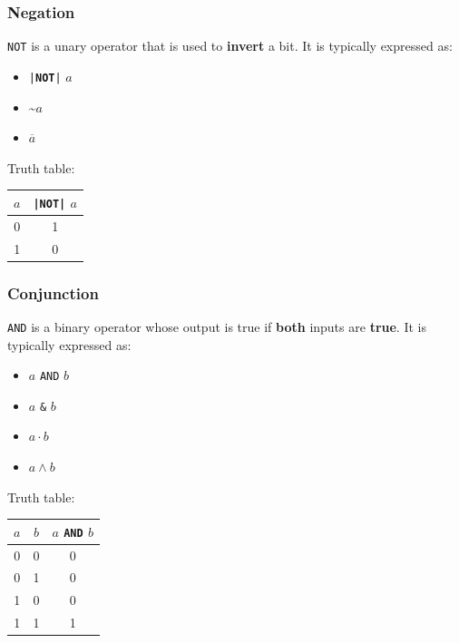 \documentclass{article}
\newcommand{\keyword}[1]{\textcolor[rgb]{0.00,0.50,0.00}{\textbf{#1}}}
\begin{document}
\subsubsection{Negation}
\texttt{NOT} is a unary operator that is used to \textbf{invert} a bit.
It is typically expressed as:
\begin{itemize}
    \item \texttt{|\keyword{NOT}|} \(a\)
    \item \textasciitilde\(a\)
    \item \(\overline{a}\)
\end{itemize}
Truth table:
\begin{table}[H]
    \centering
    \begin{tabular}{c c}
        \toprule
        \textbf{\(a\)} & \texttt{|\keyword{NOT}|} \(a\) \\
        \midrule
        0              & 1                                        \\
        1              & 0                                        \\
        \bottomrule
    \end{tabular}
\end{table}
\subsubsection{Conjunction}
\texttt{AND} is a binary operator whose output is true if \textbf{both} inputs are \textbf{true}.
It is typically expressed as:
\begin{itemize}
    \item \(a\) \texttt{AND} \(b\)
    \item \(a\) \texttt{&} \(b\)
    \item \(a \cdot b\)
    \item \(a \land b\)
\end{itemize}
Truth table:
\begin{table}[H]
    \centering
    \begin{tabular}{c c c}
        \toprule
        \textbf{\(a\)} & \textbf{\(b\)} & \textbf{\(a\) \texttt{AND} \(b\)} \\
        \midrule
        0              & 0              & 0                                           \\
        0              & 1              & 0                                           \\
        1              & 0              & 0                                           \\
        1              & 1              & 1                                           \\
        \bottomrule
    \end{tabular}
\end{table}
\end{document}
